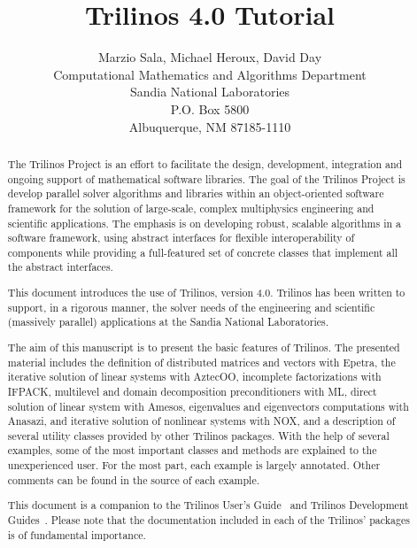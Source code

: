 \documentclass[12pt,relax]{SANDreport}
\author{Marzio Sala, Michael Heroux, David Day \\
Computational Mathematics and Algorithms Department \\
Sandia National Laboratories \\
P.O. Box 5800 \\
Albuquerque, NM 87185-1110
}
\title{Trilinos 4.0 Tutorial}
\newcommand{\Trilinos}{Trilinos}
\begin{document}
\maketitle

\begin{abstract}
  
  The Trilinos Project is an effort to facilitate the design,
  development, integration and ongoing support of mathematical software
  libraries.  The goal of the Trilinos Project is develop parallel
  solver algorithms and libraries within an object-oriented software
  framework for the solution of large-scale, complex multiphysics
  engineering and scientific applications. The emphasis is on developing
  robust, scalable algorithms in a software framework, using abstract
  interfaces for flexible interoperability of components while providing
  a full-featured set of concrete classes that implement all the
  abstract interfaces.

  \medskip
  
  This document introduces the use of \Trilinos{}, version 4.0.
  \Trilinos{} has been written to support, in a rigorous manner, the
  solver needs of the engineering and scientific (massively parallel)
  applications at the Sandia National Laboratories.

  \medskip
  
  The aim of this manuscript is to present the basic features of
  Trilinos. The presented material includes the definition of
  distributed matrices and vectors with Epetra, the iterative solution
  of linear systems with AztecOO, incomplete factorizations with IFPACK,
  multilevel and domain decomposition preconditioners with ML, direct
  solution of linear system with Amesos, eigenvalues and eigenvectors
  computations with Anasazi, and iterative solution of nonlinear systems
  with NOX, and a description of several utility classes provided by
  other Trilinos packages.  With the help of several examples, some of
  the most important classes and methods are explained to the
  unexperienced user.  For the most part, each example is largely
  annotated.  Other comments can be found in the source of each example.

  \medskip
  
  This document is a companion to the Trilinos User's
  Guide~\cite{Trilinos-Users-Guide} and Trilinos Development
  Guides~\cite{Trilinos-Dev-Guide,Trilinos-Dev-Guide-II}. Please note
  that the documentation included in each of the Trilinos' packages is
  of fundamental importance.
 
\end{abstract}
\end{document}
